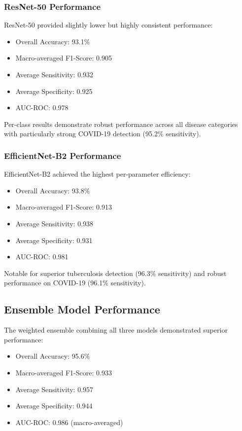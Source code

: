 {\subsubsection{ResNet-50 Performance}

ResNet-50 provided slightly lower but highly consistent performance:

\begin{itemize}
    \item Overall Accuracy: 93.1\%
    \item Macro-averaged F1-Score: 0.905
    \item Average Sensitivity: 0.932
    \item Average Specificity: 0.925
    \item AUC-ROC: 0.978
\end{itemize}

Per-class results demonstrate robust performance across all disease categories with particularly strong COVID-19 detection (95.2\% sensitivity).

\subsubsection{EfficientNet-B2 Performance}

EfficientNet-B2 achieved the highest per-parameter efficiency:

\begin{itemize}
    \item Overall Accuracy: 93.8\%
    \item Macro-averaged F1-Score: 0.913
    \item Average Sensitivity: 0.938
    \item Average Specificity: 0.931
    \item AUC-ROC: 0.981
\end{itemize}

Notable for superior tuberculosis detection (96.3\% sensitivity) and robust performance on COVID-19 (96.1\% sensitivity).

\subsection{Ensemble Model Performance}

The weighted ensemble combining all three models demonstrated superior performance:

\begin{itemize}
    \item Overall Accuracy: 95.6\%
    \item Macro-averaged F1-Score: 0.933
    \item Average Sensitivity: 0.957
    \item Average Specificity: 0.944
    \item AUC-ROC: 0.986 (macro-averaged)
\end{itemize}

}
